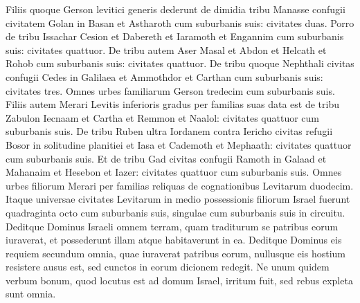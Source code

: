 \begin{biblechapter}
\verse Filiis quoque Gerson levitici generis dederunt de dimidia tribu Manasse confugii civitatem Golan in Basan et Astharoth cum suburbanis suis: civitates duas. 
\verse Porro de tribu Issachar Cesion et Dabereth 
\verse et Iaramoth et Engannim cum suburbanis suis: civitates quattuor. 
\verse De tribu autem Aser Masal et Abdon 
\verse et Helcath et Rohob cum suburbanis suis: civitates quattuor. 
\verse De tribu quoque Nephthali civitas confugii Cedes in Galilaea et Ammothdor et Carthan cum suburbanis suis: civitates tres. 
\verse Omnes urbes familiarum Gerson tredecim cum suburbanis suis. 
\verse Filiis autem Merari Levitis inferioris gradus per familias suas data est de tribu Zabulon Iecnaam et Cartha 
\verse et Remmon et Naalol: civitates quattuor cum suburbanis suis. 
\verse De tribu Ruben ultra Iordanem contra Iericho civitas refugii Bosor in solitudine planitiei et Iasa 
\verse et Cademoth et Mephaath: civitates quattuor cum suburbanis suis. 
\verse Et de tribu Gad civitas confugii Ramoth in Galaad et Mahanaim 
\verse et Hesebon et Iazer: civitates quattuor cum suburbanis suis. 
\verse Omnes urbes filiorum Merari per familias reliquas de cognationibus Levitarum duodecim. 
\verse Itaque universae civitates Levitarum in medio possessionis filiorum Israel fuerunt quadraginta octo 
\verse cum suburbanis suis, singulae cum suburbanis suis in circuitu. 
\verse Deditque Dominus Israeli omnem terram, quam traditurum se patribus eorum iuraverat, et possederunt illam atque habitaverunt in ea. 
\verse Deditque Dominus eis requiem secundum omnia, quae iuraverat patribus eorum, nullusque eis hostium resistere ausus est, sed cunctos in eorum dicionem redegit. 
\verse Ne unum quidem verbum bonum, quod locutus est ad domum Israel, irritum fuit, sed rebus expleta sunt omnia. 
\end{biblechapter}

